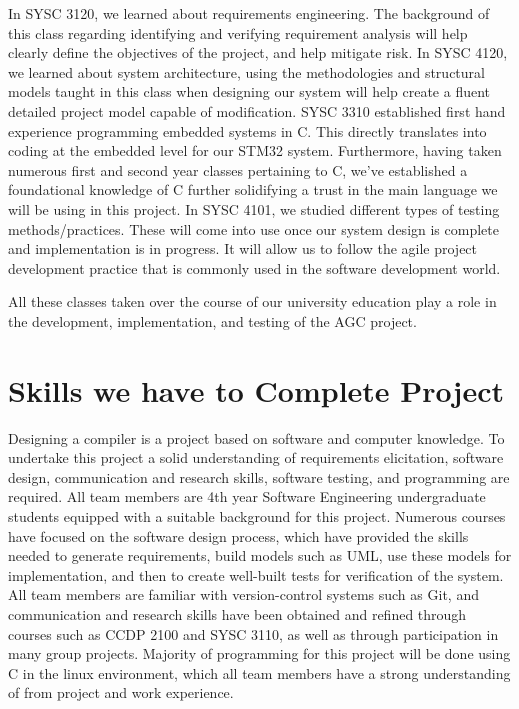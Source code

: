 \documentclass[11pt]{article}
\begin{document}
In SYSC 3120, we learned about requirements engineering. The background of this class regarding identifying and verifying requirement analysis will help clearly define the objectives of the project, and help mitigate risk. In SYSC 4120, we learned about system architecture, using the methodologies and structural models taught in this class when designing our system will help create a fluent detailed project model capable of modification. SYSC 3310 established first hand experience programming embedded systems in C. This directly translates into coding at the embedded level for our STM32 system. Furthermore, having taken numerous first and second year classes pertaining to C, we’ve established a foundational knowledge of C further solidifying a trust in the  main language we will be using in this project. In SYSC 4101, we studied different types of testing methods/practices. These will come into use once our system design is complete and implementation is in progress. It will allow us to follow the agile project development practice that is commonly used in the software development world.

	All these classes taken over the course of our university education play a role in the development, implementation, and testing of the AGC project.

\section{Skills we have to Complete Project}

Designing a compiler is a project based on software and computer knowledge. To undertake this project a solid understanding of requirements elicitation, software design, communication and research skills, software testing, and programming are required.  All team members are 4th year Software Engineering undergraduate students equipped with a suitable background for this project. Numerous courses have focused on the software design process, which have provided the skills needed to generate requirements, build models such as UML, use these models for implementation, and then to create well-built tests for verification of the system. All team members are familiar with version-control systems such as Git, and communication and research skills have been obtained and refined through courses such as CCDP 2100 and SYSC 3110, as well as through participation in many group projects. Majority of programming for this project will be done using C in the linux environment, which all team members have a strong understanding of from project and work experience.
\end{document}
